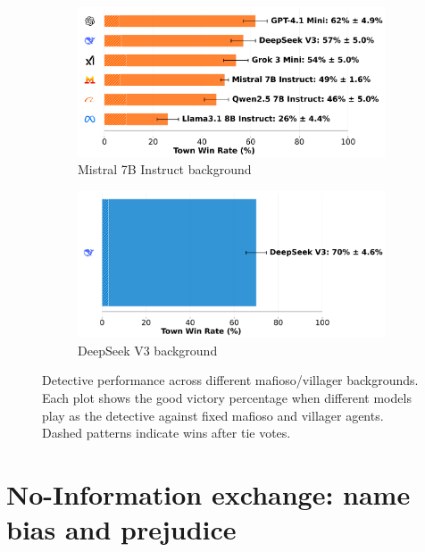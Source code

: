 \documentclass{article}
\begin{document}
\begin{figure}[htbp]
    \begin{subfigure}[b]{0.48\textwidth}
        \centering
        \includegraphics[width=\textwidth]{../results/detective_mistral_7b_instruct_v4_1_benchmark.png}
        \caption{Mistral 7B Instruct background}
        \label{fig:detective_mistral}
    \end{subfigure}
    \hfill
    \begin{subfigure}[b]{0.48\textwidth}
        \centering
        \includegraphics[width=\textwidth]{../results/detective_deepseek_v3_v4_1_benchmark.png}
        \caption{DeepSeek V3 background}
        \label{fig:detective_deepseek}
    \end{subfigure}
    \caption{Detective performance across different mafioso/villager backgrounds. Each plot shows the good victory percentage when different models play as the detective against fixed mafioso and villager agents. Dashed patterns indicate wins after tie votes.}
    \label{fig:disclose_results}
\end{figure}




\section{No-Information exchange: name bias and prejudice}
\end{document}
